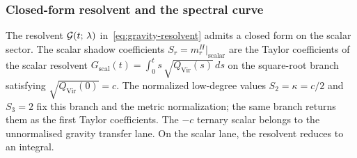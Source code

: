 \subsubsection*{Closed-form resolvent and the spectral curve}

The resolvent $\mathcal{G}(t;\,\lambda)$ in~\eqref{eq:gravity-resolvent}
admits a closed form on the scalar sector. The scalar shadow
coefficients $S_r = m_r^H|_{\text{scalar}}$ are the Taylor
coefficients of the scalar resolvent
$G_{\mathrm{scal}}(t) = \int_0^t s\,\sqrt{Q_{\mathrm{Vir}}(s)}\,ds$
on the square-root branch satisfying
$\sqrt{Q_{\mathrm{Vir}}(0)}=c$. The normalized low-degree values
$S_2 = \kappa = c/2$ and $S_3=2$ fix this branch and the metric
normalization; the same branch returns them as the first Taylor
coefficients. The $-c$ ternary scalar belongs to the unnormalised
gravity transfer lane.
On the scalar lane, the resolvent reduces to an integral.

